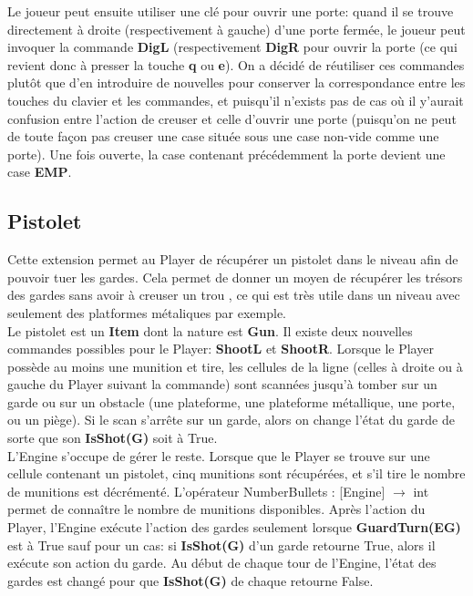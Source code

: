 \documentclass{article}
\begin{document}
Le joueur peut ensuite utiliser une clé pour ouvrir une porte: quand il se trouve directement à droite (respectivement à gauche) d'une porte fermée, le joueur peut invoquer la commande \textbf{DigL} (respectivement \textbf{DigR} pour ouvrir la porte (ce qui revient donc à presser la touche \textbf{q} ou \textbf{e}). On a décidé de réutiliser ces commandes plutôt que d'en introduire de nouvelles pour conserver la correspondance entre les touches du clavier et les commandes, et puisqu'il n'exists pas de cas où il y'aurait confusion entre l'action de creuser et celle d'ouvrir une porte (puisqu'on ne peut de toute façon pas creuser une case située sous une case non-vide comme une porte). Une fois ouverte, la case contenant précédemment la porte devient une case \textbf{EMP}.

\subsection{Pistolet}

Cette extension permet au Player de récupérer un pistolet dans le niveau afin de pouvoir tuer les gardes. Cela permet de donner un moyen de récupérer les trésors des gardes sans avoir à creuser un trou , ce qui est très utile dans un niveau avec seulement des platformes métaliques par exemple.\\

Le pistolet est un \textbf{Item} dont la nature est \textbf{Gun}. Il existe deux nouvelles commandes possibles pour le Player: \textbf{ShootL} et \textbf{ShootR}. Lorsque le Player possède au moins une munition et tire, les cellules de la ligne (celles à droite ou à gauche du Player suivant la commande) sont scannées jusqu'à tomber sur un garde ou sur un obstacle (une plateforme, une plateforme métallique, une porte, ou un piège). Si le scan s'arrête  sur un garde, alors on change l'état du garde de sorte que son \textbf{IsShot(G)} soit à True.\\

L'Engine s'occupe de gérer le reste. Lorsque que le Player se trouve sur une cellule contenant un pistolet, cinq munitions sont récupérées, et s'il tire le nombre de munitions est décrémenté. L'opérateur \textrm{NumberBullets : [Engine] $\rightarrow$ int} permet de connaître le nombre de munitions disponibles. Après l'action du Player, l'Engine exécute l'action des gardes seulement lorsque \textbf{GuardTurn(EG)} est à True sauf pour un cas: si \textbf{IsShot(G)} d'un garde retourne True, alors il exécute son action du garde. Au début de chaque tour de l'Engine, l'état des gardes est changé pour que \textbf{IsShot(G)} de chaque retourne False.\\
\end{document}
